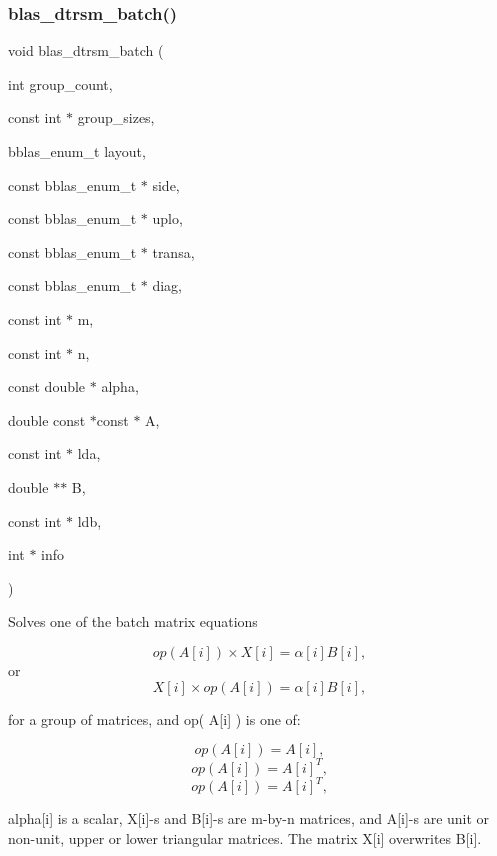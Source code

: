 \subsubsection{\texorpdfstring{blas\+\_\+dtrsm\+\_\+batch()}{blas\_dtrsm\_batch()}}
{\footnotesize\ttfamily void blas\+\_\+dtrsm\+\_\+batch (\begin{DoxyParamCaption}\item[{int}]{group\+\_\+count,  }\item[{const int $\ast$}]{group\+\_\+sizes,  }\item[{bblas\+\_\+enum\+\_\+t}]{layout,  }\item[{const bblas\+\_\+enum\+\_\+t $\ast$}]{side,  }\item[{const bblas\+\_\+enum\+\_\+t $\ast$}]{uplo,  }\item[{const bblas\+\_\+enum\+\_\+t $\ast$}]{transa,  }\item[{const bblas\+\_\+enum\+\_\+t $\ast$}]{diag,  }\item[{const int $\ast$}]{m,  }\item[{const int $\ast$}]{n,  }\item[{const double $\ast$}]{alpha,  }\item[{double const $\ast$const $\ast$}]{A,  }\item[{const int $\ast$}]{lda,  }\item[{double $\ast$$\ast$}]{B,  }\item[{const int $\ast$}]{ldb,  }\item[{int $\ast$}]{info }\end{DoxyParamCaption})}

Solves one of the batch matrix equations

\[ op( A[i] )\times X[i] = \alpha[i] B[i], \] or \[ X[i] \times op( A[i] ) = \alpha[i] B[i], \]

for a group of matrices, and op( A\mbox{[}i\mbox{]} ) is one of\+:

\[ op( A[i] ) = A[i], \] \[ op( A[i] ) = A[i]^T, \] \[ op( A[i] ) = A[i]^T, \]

alpha\mbox{[}i\mbox{]} is a scalar, X\mbox{[}i\mbox{]}-\/s and B\mbox{[}i\mbox{]}-\/s are m-\/by-\/n matrices, and A\mbox{[}i\mbox{]}-\/s are unit or non-\/unit, upper or lower triangular matrices. The matrix X\mbox{[}i\mbox{]} overwrites B\mbox{[}i\mbox{]}.


